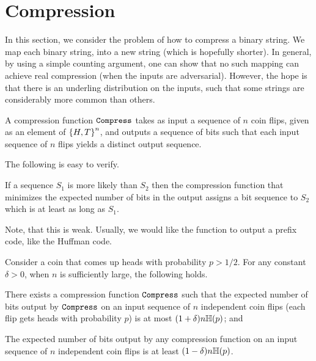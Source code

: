 
\section{Compression}

In this section, we consider the problem of how to compress a binary
string. We map each binary string, into a new string (which is
hopefully shorter).  In general, by using a simple counting argument,
one can show that no such mapping can achieve real compression (when
the inputs are adversarial). However, the hope is that there is an
underling distribution on the inputs, such that some strings are
considerably more common than others.

\begin{defn}
    A compression function $\mathtt{Compress}$ takes as input a sequence
    of $n$ coin flips, given as an element of $\left\{ {H,T} \right\}^n$, and
    outputs a sequence of bits such that each input sequence of $n$
    flips yields a distinct output sequence.
\end{defn}

The following is easy to verify.
\begin{lemma}
    If a sequence $S_1$ is more likely than $S_2$ then the compression
    function that minimizes the expected number of bits in the output
    assigns a bit sequence to $S_2$ which is at least as long as
    $S_1$. 

\end{lemma}



Note, that this is weak. Usually, we would like the function to output
a prefix code, like the Huffman code.
\begin{theorem}
    Consider a coin that comes up heads with probability $p > 1/2$. For
    any constant $\delta >0$, when $n$ is sufficiently large, the
    following holds.
    \begin{compactenumi}
        \item There exists a compression function $\mathtt{Compress}$ such
        that the expected number of bits output by $\mathtt{Compress}$ on
        an input sequence of $n$ independent coin flips (each flip
        gets heads with probability $p$) is at most $(1+\delta) n
        \Entropy{p}$; and

        \item The expected number of bits output by any compression
        function on an input sequence of $n$ independent coin flips is
        at least $(1-\delta)n \Entropy{p}$.
    \end{compactenumi}
\end{theorem}

